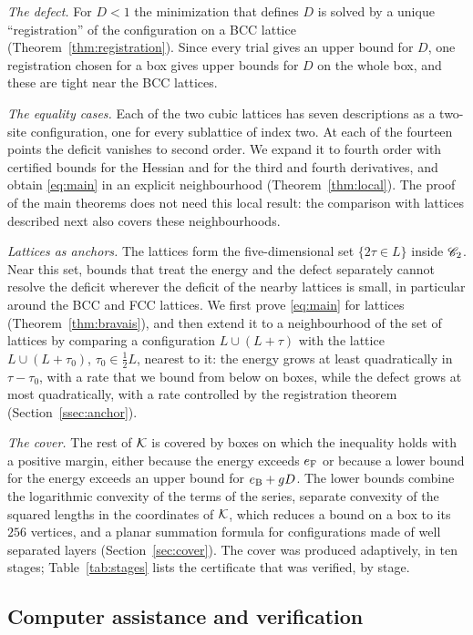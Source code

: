 \emph{The defect.} For $D<1$ the minimization that defines $D$ is solved by a unique ``registration'' of the configuration on a
BCC lattice (Theorem~\ref{thm:registration}). Since every trial gives an upper bound for $D$, one registration chosen for a box gives
upper bounds for $D$ on the whole box, and these are tight near the BCC lattices.

\emph{The equality cases.} Each of the two cubic lattices has seven descriptions as a two-site configuration, one for every
sublattice of index two. At each of the fourteen points the deficit vanishes to second order. We expand it to fourth order with
certified bounds for the Hessian and for the third and fourth derivatives, and obtain \eqref{eq:main} in an explicit neighbourhood
(Theorem~\ref{thm:local}). The proof of the main theorems does not need this local result: the comparison with lattices described
next also covers these neighbourhoods.

\emph{Lattices as anchors.} The lattices form the five-dimensional set $\{2\tau\in L\}$ inside $\mathscr C_2$. Near this set, bounds that
treat the energy and the defect separately cannot resolve the deficit wherever the deficit of the nearby lattices is small, in
particular around the BCC and FCC lattices. We first prove \eqref{eq:main} for lattices
(Theorem~\ref{thm:bravais}), and then extend it to a neighbourhood of the set of lattices by comparing a configuration
$L\cup(L+\tau)$ with the lattice $L\cup(L+\tau_0)$, $\tau_0\in\frac12L$, nearest to it: the energy grows at least quadratically in
$\tau-\tau_0$, with a rate that we bound from below on boxes, while the defect grows at most quadratically, with a rate controlled
by the registration theorem (Section~\ref{ssec:anchor}).

\emph{The cover.} The rest of $\mathcal K$ is covered by boxes on which the inequality holds with a positive margin, either because the
energy exceeds $e_{\mathrm F}$ or because a lower bound for the energy exceeds an upper bound for $e_{\mathrm B}+g D$. The lower bounds combine the
logarithmic convexity of the terms of the series, separate convexity of the squared lengths in the coordinates of $\mathcal K$, which
reduces a bound on a box to its $256$ vertices, and a planar summation formula for configurations made of well separated layers
(Section~\ref{sec:cover}). The cover was produced adaptively, in ten stages; Table~\ref{tab:stages} lists the certificate that was
verified, by stage.

\subsection{Computer assistance and verification}\label{ssec:verification}

